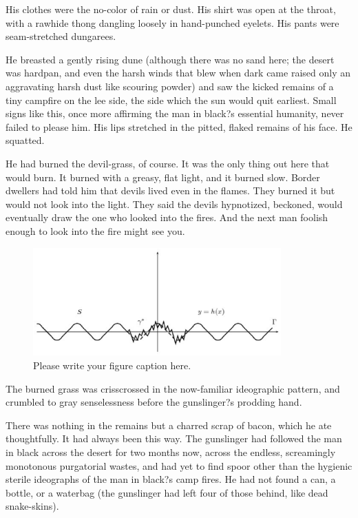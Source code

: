 \documentclass[
11pt,%
tightenlines,%
twoside,%
onecolumn,%
nofloats,%
nobibnotes,%
nofootinbib,%
superscriptaddress,%
noshowpacs,%
centertags]%
{revtex4}
\begin{document}
His clothes were the no-color of rain or dust. His shirt was open at the throat, with a rawhide thong dangling loosely in hand-punched eyelets. His pants were seam-stretched dungarees.

He breasted a gently rising dune (although there was no sand here; the desert was hardpan, and even the harsh winds that blew when dark came raised only an aggravating harsh dust like scouring powder) and saw the kicked remains of a tiny campfire on the lee side, the side which the sun would quit earliest. Small signs like this, once more affirming the man in black?s essential humanity, never failed to please him. His lips stretched in the pitted, flaked remains of his face. He squatted.

He had burned the devil-grass, of course. It was the only thing out here that would burn. It burned with a greasy, flat light, and it burned slow. Border dwellers had told him that devils lived even in the flames. They burned it but would not look into the light. They said the devils hypnotized, beckoned, would eventually draw the one who looked into the fires. And the next man foolish enough to look into the fire might see you.

\begin{figure}[h]
\setcaptionmargin{5mm}
\onelinecaptionstrue  %
\includegraphics[width=0.85\textwidth]{deform.eps}
\caption{Please write your figure caption here.}\label{fig:1}
\end{figure}

The burned grass was crisscrossed in the now-familiar ideographic pattern, and crumbled to gray senselessness before the gunslinger?s prodding hand. 

There was nothing in the remains but a charred scrap of bacon, which he ate thoughtfully. It had always been this way. The gunslinger had followed the man in black across the desert for two months now, across the endless, screamingly monotonous purgatorial wastes, and had yet to find spoor other than the hygienic sterile ideographs of the man in black?s camp fires. He had not found a can, a bottle, or a waterbag (the gunslinger had left four of those behind, like dead snake-skins).
\end{document}
